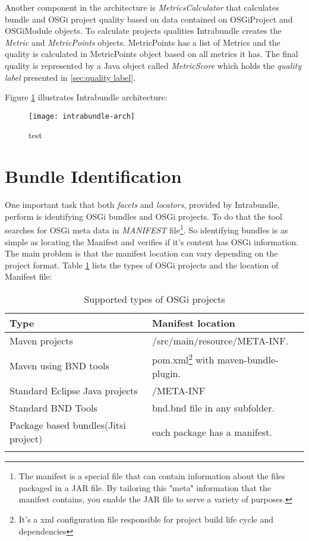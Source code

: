 Another component in the architecture is \emph{MetricsCalculator} that calculates bundle and OSGi project quality based on data contained on OSGiProject and OSGiModule objects. To calculate projects qualities Intrabundle creates the \emph{Metric} and \emph{MetricPoints} objects. MetricPoints has a list of Metrics and the quality is calculated in MetricPoints object based on all metrics it has. The final quality is represented by a Java object called \emph{MetricScore} which holds the \emph{quality label} presented in \ref{sec:quality label}.     

\newpage
Figure \ref{intrabundle-arch} illustrates Intrabundle architecture:

\begin{figure}[h]
\caption{test}
\label{intrabundle-arch}
\centering
\texttt{[image: intrabundle-arch]}
\end{figure}  
\FloatBarrier


\section{Bundle Identification}

One important task that both \emph{facets} and \emph{locators}, provided by Intrabundle, perform is identifying OSGi bundles and OSGi projects. To do that the tool searches for OSGi meta data in \emph{MANIFEST} file\footnote{The manifest is a special file that can contain information about the files packaged in a JAR file. By tailoring this "meta" information that the manifest contains, you enable the JAR file to serve a variety of purposes.}. So identifying bundles is as simple as locating the Manifest and verifies if it's content has OSGi information. The main problem is that the manifest location can vary depending on the project format. Table \ref{osgi-project-type} lists the types of OSGi projects and the location of Manifest file:     

\begin{table}[h]
\caption{Supported types of OSGi projects}
\label{osgi-project-type}
\begin{center}
    \begin{tabular}{  p{4cm} | p{6cm} }
    \Xhline{2\arrayrulewidth}
    Type & Manifest location \\  \hline
    Maven projects & /src/main/resource/META-INF.\\ \hline
    Maven using BND tools & pom.xml\footnote{It's a xml configuration file responsible for project build life cycle and dependencies} with maven-bundle-plugin.\\ \hline
    Standard Eclipse Java projects & /META-INF\\ \hline
    Standard BND Tools & bnd.bnd file in any subfolder.\\ \hline
    Package based bundles(Jitsi project) & each package has a manifest.\\  
   \Xhline{2\arrayrulewidth}

    \end{tabular}
\end{center}
\end{table}
\FloatBarrier


